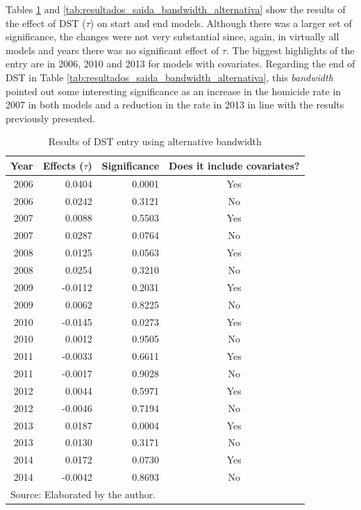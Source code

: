 \documentclass[12pt,openright,oneside,a4paper,english,french,spanish]{abntex2}
\numberwithin{table}{section} %
\numberwithin{figure}{section} %
\begin{document}
\begin{otherlanguage}{english}
Tables \ref{tab:resultados_entrada_bandwidth_alternativa} and \ref{tab:resultados_saida_bandwidth_alternativa} show the results of the effect of DST ($\tau$) on start and end models. Although there was a larger set of significance, the changes were not very substantial since, again, in virtually all models and years there was no significant effect of $\tau$. The biggest highlights of the entry are in 2006, 2010 and 2013 for models with covariates. Regarding the end of DST in Table \ref{tab:resultados_saida_bandwidth_alternativa}, this \textit{bandwidth} pointed out some interesting significance as an increase in the homicide rate in 2007 in both models and a reduction in the rate in 2013 in line with the results previously presented.

\begin{table}[H]
\caption{Results of DST entry using alternative bandwidth}
\begin{center}
\begin{small}
\begin{tabular}{rrrc}
  \hline
Year & Effects ($\tau$) & Significance & Does it include covariates? \\ 
  \hline
2006 & 0.0404 & 0.0001 & Yes \\ 
2006 & 0.0242 & 0.3121 & No \\ 
2007 & 0.0088 & 0.5503 & Yes \\ 
2007 & 0.0287 & 0.0764 & No \\ 
2008 & 0.0125 & 0.0563 & Yes \\ 
2008 & 0.0254 & 0.3210 & No \\ 
2009 & -0.0112 & 0.2031 & Yes \\ 
2009 & 0.0062 & 0.8225 & No \\ 
2010 & -0.0145 & 0.0273 & Yes \\ 
2010 & 0.0012 & 0.9505 & No \\ 
2011 & -0.0033 & 0.6611 & Yes \\ 
2011 & -0.0017 & 0.9028 & No \\ 
2012 & 0.0044 & 0.5971 & Yes \\ 
2012 & -0.0046 & 0.7194 & No \\ 
2013 & 0.0187 & 0.0004 & Yes \\ 
2013 & 0.0130 & 0.3171 & No \\ 
2014 & 0.0172 & 0.0730 & Yes \\ 
2014 & -0.0042 & 0.8693 & No \\
   \hline
\multicolumn{4}{l}{Source: Elaborated by the author.}
\end{tabular}
\end{small}
\end{center}
\label{tab:resultados_entrada_bandwidth_alternativa}
\end{table}



\end{otherlanguage}
\end{document}
